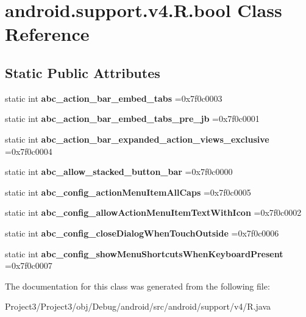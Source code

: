 \hypertarget{classandroid_1_1support_1_1v4_1_1R_1_1bool}{}\section{android.\+support.\+v4.\+R.\+bool Class Reference}
\label{classandroid_1_1support_1_1v4_1_1R_1_1bool}
\subsection*{Static Public Attributes}
\begin{DoxyCompactItemize}
\item 
\mbox{\label{classandroid_1_1support_1_1v4_1_1R_1_1bool_a3956ebaa5be58efba85352bb98d01bf7}} 
static int {\bfseries abc\+\_\+action\+\_\+bar\+\_\+embed\+\_\+tabs} =0x7f0c0003
\item 
\mbox{\label{classandroid_1_1support_1_1v4_1_1R_1_1bool_ac3ffa4be9bf37d3de2c7f5398cf29455}} 
static int {\bfseries abc\+\_\+action\+\_\+bar\+\_\+embed\+\_\+tabs\+\_\+pre\+\_\+jb} =0x7f0c0001
\item 
\mbox{\label{classandroid_1_1support_1_1v4_1_1R_1_1bool_a91a418fc40d23425cad040ccae2a2b8e}} 
static int {\bfseries abc\+\_\+action\+\_\+bar\+\_\+expanded\+\_\+action\+\_\+views\+\_\+exclusive} =0x7f0c0004
\item 
\mbox{\label{classandroid_1_1support_1_1v4_1_1R_1_1bool_a2193ba503dbf3f512da4aa1196f747c4}} 
static int {\bfseries abc\+\_\+allow\+\_\+stacked\+\_\+button\+\_\+bar} =0x7f0c0000
\item 
\mbox{\label{classandroid_1_1support_1_1v4_1_1R_1_1bool_a6d7442870ad7a179fc8ead6bf2e7a275}} 
static int {\bfseries abc\+\_\+config\+\_\+action\+Menu\+Item\+All\+Caps} =0x7f0c0005
\item 
\mbox{\label{classandroid_1_1support_1_1v4_1_1R_1_1bool_a558f8505a0b7692602ad8add39ccd14a}} 
static int {\bfseries abc\+\_\+config\+\_\+allow\+Action\+Menu\+Item\+Text\+With\+Icon} =0x7f0c0002
\item 
\mbox{\label{classandroid_1_1support_1_1v4_1_1R_1_1bool_a1571df98f8886d5a2d8b99fdbd0c1649}} 
static int {\bfseries abc\+\_\+config\+\_\+close\+Dialog\+When\+Touch\+Outside} =0x7f0c0006
\item 
\mbox{\label{classandroid_1_1support_1_1v4_1_1R_1_1bool_a051ae4341b1fb9949e57b7e663b3cdd6}} 
static int {\bfseries abc\+\_\+config\+\_\+show\+Menu\+Shortcuts\+When\+Keyboard\+Present} =0x7f0c0007
\end{DoxyCompactItemize}


The documentation for this class was generated from the following file\+:\begin{DoxyCompactItemize}
\item 
Project3/\+Project3/obj/\+Debug/android/src/android/support/v4/R.\+java\end{DoxyCompactItemize}
